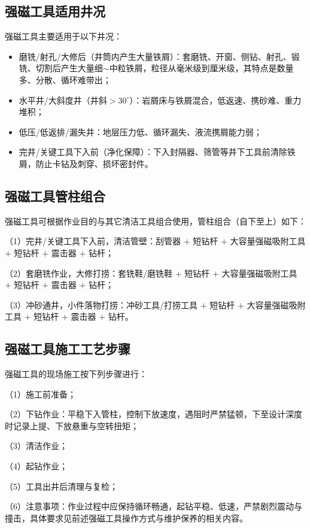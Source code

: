 \subsection{强磁工具适用井况}

强磁工具主要适用于以下井况：

\begin{itemize}
	\item 磨铣/射孔/大修后（井筒内产生大量铁屑）：套磨铣、开窗、侧钻、射孔、锻铣、切割后产生大量细$\sim$中粒铁屑，粒径从毫米级到厘米级，其特点是数量多、分散、循环难带出；
	\item 水平井/大斜度井（井斜$> 30^\circ$）：岩屑床与铁屑混合，低返速、携砂难、重力堆积；
	\item 低压/低返排/漏失井：地层压力低、循环漏失、液流携屑能力弱；
	\item 完井/关键工具下入前（净化保障）：下入封隔器、筛管等井下工具前清除铁屑，防止卡钻及刺穿、损坏密封件。
\end{itemize}

\subsection{强磁工具管柱组合}

强磁工具可根据作业目的与其它清洁工具组合使用，管柱组合（自下至上）如下：

（1）完井/关键工具下入前，清洁管壁：刮管器 $+$ 短钻杆 $+$ 大容量强磁吸附工具 $+$ 短钻杆 $+$ 震击器 $+$ 钻杆；

（2）套磨铣作业，大修打捞：套铣鞋/磨铣鞋 $+$ 短钻杆 $+$ 大容量强磁吸附工具 $+$ 短钻杆 $+$ 震击器 $+$ 钻杆；

（3）冲砂通井，小件落物打捞：冲砂工具/打捞工具 $+$ 短钻杆 $+$ 大容量强磁吸附工具 $+$ 短钻杆 $+$ 震击器 $+$ 钻杆。

\subsection{强磁工具施工工艺步骤}

强磁工具的现场施工按下列步骤进行：

（1）施工前准备；

（2）下钻作业：平稳下入管柱，控制下放速度，遇阻时严禁猛顿，下至设计深度时记录上提、下放悬重与空转扭矩；

（3）清洁作业；

（4）起钻作业；

（5）工具出井后清理与复检；

（6）注意事项：作业过程中应保持循环畅通，起钻平稳、低速，严禁剧烈震动与撞击，具体要求见前述强磁工具操作方式与维护保养的相关内容。




